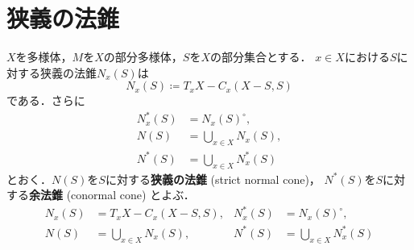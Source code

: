 \section{狭義の法錐}
\(X\)を多様体，\(M\)を\(X\)の部分多様体，\(S\)を\(X\)の部分集合とする．
\(x\in X\)における\(S\)に対する狭義の法錐\(N_{x}(S)\)は
\[
    N_{x}(S)\coloneqq
    T_{x}X-C_{x}(X-S,S)
\]
である．さらに
\begin{align*}
    N_{x}^{\ast}(S)&=N_{x}(S)^{\circ},\\
    N(S)&=\bigcup_{x\in X}N_{x}(S),\\
    N^{\ast}(S)&=\bigcup_{x\in X}N_{x}^{\ast}(S)
\end{align*}
とおく．\(N(S)\)を\(S\)に対する\textbf{狭義の法錐} (strict normal cone)，
\(N^{\ast}(S)\)を\(S\)に対する\textbf{余法錐} (conormal cone) とよぶ．
\begin{align*}
    N_{x}(S)&=
    T_{x}X-C_{x}(X-S,S),
    &
    N_{x}^{\ast}(S)&=N_{x}(S)^{\circ},\\
    N(S)&=\bigcup_{x\in X}N_{x}(S),
    &
    N^{\ast}(S)&=\bigcup_{x\in X}N_{x}^{\ast}(S)
\end{align*}
